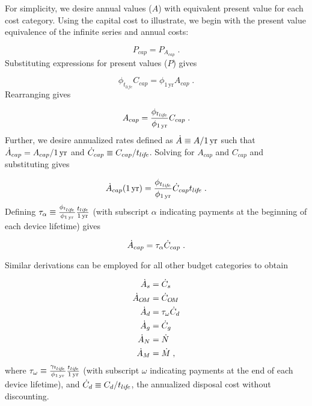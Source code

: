 For simplicity, we desire annual values ($A$)
with equivalent present value for each cost category. 
Using the capital cost to illustrate, 
we begin with the present value equivalence of the infinite series and 
annual costs:

\begin{equation}
  P_{cap} = P_{A_{cap}} \; .
\end{equation}
%
Substituting expressions for present values ($P$) gives

\begin{equation}
  \phi_{t_{life}} C_{cap} = \phi_{1\,\mathrm{yr}} A_{cap} \; .
\end{equation}
%
Rearranging gives

\begin{equation}
  A_{cap} = \frac{\phi_{t_{li\!f\!e}}}{\phi_{1\,\mathrm{yr}}} C_{cap} \; .
\end{equation}
%
Further, we desire annualized rates defined as
$\dot{A} \equiv A/1\,\mathrm{yr}$ such that
$\dot{A}_{cap} = A_{cap}/1\,\mathrm{yr}$
and 
$\dot{C}_{cap} \equiv C_{cap}/t_{li\!f\!e}$.
Solving for $A_{cap}$ and $C_{cap}$ and substituting gives

\begin{equation}
  \dot{A}_{cap} (1\,\mathrm{yr}) = \frac{\phi_{t_{li\!f\!e}}}{\phi_{1\,\mathrm{yr}}} \dot{C}_{cap} t_{li\!f\!e} \; .
\end{equation}
%
Defining $\tau_\alpha \equiv \frac{\phi_{t_{li\!f\!e}}}{\phi_{1\,\mathrm{yr}}} \frac{t_{li\!f\!e}}{1\,\mathrm{yr}}$ 
(with subscript $\alpha$ indicating payments at the beginning of each 
device lifetime) gives

\begin{equation}
  \dot{A}_{cap} = \tau_\alpha \dot{C}_{cap} \; .
\end{equation}

Similar derivations can be employed for all other budget categories
to obtain

\begin{align}
  \dot{A}_s &= \dot{C}_s \\
  \dot{A}_{O\!M} &= \dot{C}_{O\!M} \\
  \dot{A}_d &= \tau_\omega \dot{C}_d \\
  \dot{A}_g &= \dot{C}_g \\
  \dot{A}_N &= \dot{N} \\
  \dot{A}_M &= \dot{M} \; ,
\end{align}
%
where 
$\tau_\omega \equiv \frac{\gamma_{t_{li\!f\!e}}}{\phi_{1\,\mathrm{yr}}} \frac{t_{li\!f\!e}}{1\,\mathrm{yr}}$
(with subscript $\omega$ indicating payments 
at the end of each device lifetime), and 
$\dot{C}_d \equiv C_d / t_{li\!f\!e}$, the annualized disposal cost 
without discounting.

